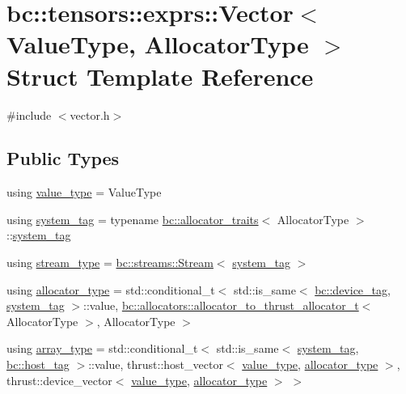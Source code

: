 \hypertarget{structbc_1_1tensors_1_1exprs_1_1Vector}{}\section{bc\+:\+:tensors\+:\+:exprs\+:\+:Vector$<$ Value\+Type, Allocator\+Type $>$ Struct Template Reference}
\label{structbc_1_1tensors_1_1exprs_1_1Vector}


{\ttfamily \#include $<$vector.\+h$>$}

\subsection*{Public Types}
\begin{DoxyCompactItemize}
\item 
using \hyperlink{structbc_1_1tensors_1_1exprs_1_1Vector_a61ba759af8b26329103ce2b0765dade5}{value\+\_\+type} = Value\+Type
\item 
using \hyperlink{structbc_1_1tensors_1_1exprs_1_1Vector_a828fecb38556a2bd72fc88dab4eb9bfe}{system\+\_\+tag} = typename \hyperlink{structbc_1_1allocators_1_1allocator__traits}{bc\+::allocator\+\_\+traits}$<$ Allocator\+Type $>$\+::\hyperlink{structbc_1_1tensors_1_1exprs_1_1Vector_a828fecb38556a2bd72fc88dab4eb9bfe}{system\+\_\+tag}
\item 
using \hyperlink{structbc_1_1tensors_1_1exprs_1_1Vector_a6a9edbbd7f8743e3a303e64ac887e498}{stream\+\_\+type} = \hyperlink{classbc_1_1streams_1_1Stream}{bc\+::streams\+::\+Stream}$<$ \hyperlink{structbc_1_1tensors_1_1exprs_1_1Vector_a828fecb38556a2bd72fc88dab4eb9bfe}{system\+\_\+tag} $>$
\item 
using \hyperlink{structbc_1_1tensors_1_1exprs_1_1Vector_a94fd93f892cde60396b78ab67b180a19}{allocator\+\_\+type} = std\+::conditional\+\_\+t$<$ std\+::is\+\_\+same$<$ \hyperlink{structbc_1_1device__tag}{bc\+::device\+\_\+tag}, \hyperlink{structbc_1_1tensors_1_1exprs_1_1Vector_a828fecb38556a2bd72fc88dab4eb9bfe}{system\+\_\+tag} $>$\+::value, \hyperlink{namespacebc_1_1allocators_ab6233c0d8d9d7391c3abdbdf1fded326}{bc\+::allocators\+::allocator\+\_\+to\+\_\+thrust\+\_\+allocator\+\_\+t}$<$ Allocator\+Type $>$, Allocator\+Type $>$
\item 
using \hyperlink{structbc_1_1tensors_1_1exprs_1_1Vector_a73521248268e63ecefe36bca57afcf20}{array\+\_\+type} = std\+::conditional\+\_\+t$<$ std\+::is\+\_\+same$<$ \hyperlink{structbc_1_1tensors_1_1exprs_1_1Vector_a828fecb38556a2bd72fc88dab4eb9bfe}{system\+\_\+tag}, \hyperlink{structbc_1_1host__tag}{bc\+::host\+\_\+tag} $>$\+::value, thrust\+::host\+\_\+vector$<$ \hyperlink{structbc_1_1tensors_1_1exprs_1_1Vector_a61ba759af8b26329103ce2b0765dade5}{value\+\_\+type}, \hyperlink{structbc_1_1tensors_1_1exprs_1_1Vector_a94fd93f892cde60396b78ab67b180a19}{allocator\+\_\+type} $>$, thrust\+::device\+\_\+vector$<$ \hyperlink{structbc_1_1tensors_1_1exprs_1_1Vector_a61ba759af8b26329103ce2b0765dade5}{value\+\_\+type}, \hyperlink{structbc_1_1tensors_1_1exprs_1_1Vector_a94fd93f892cde60396b78ab67b180a19}{allocator\+\_\+type} $>$ $>$

\end{DoxyCompactItemize}
